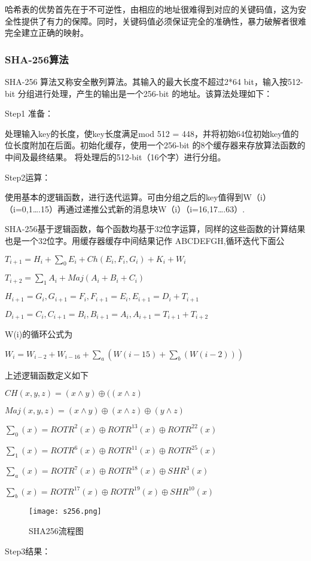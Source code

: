 \documentclass[withoutpreface,bwprint]{cumcmthesis} %
\begin{document}
哈希表的优势首先在于不可逆性，由相应的地址很难得到对应的关键码值，这为安全性提供了有力的保障。同时，关键码值必须保证完全的准确性，暴力破解者很难完全建立正确的映射。

\subsubsection{SHA-256算法}

SHA-256 算法又称安全散列算法。其输入的最大长度不超过2*64 bit，输入按512-bit 分组进行处理，产生的输出是一个256-bit 的地址。该算法处理如下：

Step1 准备：

处理输入key的长度，使key长度满足mod 512 = 448，并将初始64位初始key值的位长度附加在后面。初始化缓存，使用一个256-bit 的8个缓存器来存放算法函数的中间及最终结果。 将处理后的512-bit（16个字）进行分组。

Step2运算：

使用基本的逻辑函数，进行迭代运算。可由分组之后的key值得到W（i）（i=0,1….15）再通过递推公式新的消息块W（i）（i=16,17….63）.

SHA-256基于逻辑函数，每个函数均基于32位字运算，同样的这些函数的计算结果也是一个32位字。用缓存器缓存中间结果记作 ABCDEFGH,循环迭代下面公

$T_{i+1}=H_{i}+\sum_0{E_{i}}+Ch(E_{i},F_{i},G_{i})+K_{i}+W_{i}$

$T_{i+2}=\sum_1{A_{i}+Maj(A_{i}+B_{i}+C_{i})}$

$H_{i+1}=G_{i},G_{i+1}=F_{i},F_{i+1}=E_{i},E_{i+1}=D_{i}+T_{i+1}$

$D_{i+1}=C_{i},C_{i+1}=B_{i},B_{i+1}=A_{i},A_{i+1}=T_{i+1}+T_{i+2}$

W(i)的循环公式为

$W_{i}=W_{i-2}+W_{i-16}+\sum_a(W(i-15)+\sum_b(W(i-2)))$

上述逻辑函数定义如下

$CH( x, y, z) = (x\land y) \oplus  ( (x\land z)$

$Maj( x, y, z) = (x \land y) \oplus (x \land z) \oplus (y \land z)$

$\sum_0(x) = ROTR^{2}(x) \oplus ROTR^{13}(x) \oplus ROTR^{22}(x)$

$\sum_1(x) = ROTR^{6}(x) \oplus ROTR^{11}(x) \oplus ROTR^{25}(x)$

$\sum_a(x) = ROTR^{7}(x) \oplus ROTR^{18}(x) \oplus SHR^{3}(x)$

$\sum_b(x) = ROTR^{17}(x) \oplus ROTR^{19}(x) \oplus SHR^{10}(x)$

\begin{figure}[ht]
	\centering
	\texttt{[image: s256.png]}
	\caption{SHA256流程图}
\end{figure}
Step3结果：
\end{document}
